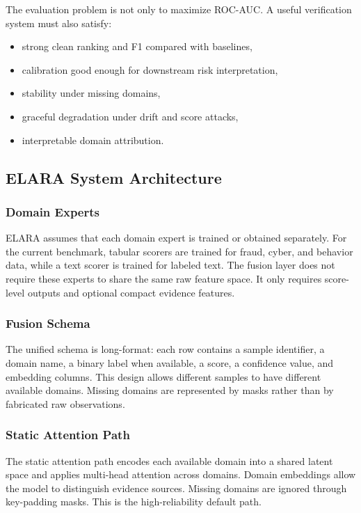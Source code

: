 \documentclass[10pt,conference]{IEEEtran}
\newcommand{\system}{ELARA}
\begin{document}
The evaluation problem is not only to maximize ROC-AUC. A useful verification
system must also satisfy:
\begin{itemize}
  \item strong clean ranking and F1 compared with baselines,
  \item calibration good enough for downstream risk interpretation,
  \item stability under missing domains,
  \item graceful degradation under drift and score attacks,
  \item interpretable domain attribution.
\end{itemize}

\subsection{\system{} System Architecture}
\subsubsection{Domain Experts}
\system{} assumes that each domain expert is trained or obtained separately.
For the current benchmark, tabular scorers are trained for fraud, cyber, and
behavior data, while a text scorer is trained for labeled text. The fusion layer
does not require these experts to share the same raw feature space. It only
requires score-level outputs and optional compact evidence features.

\subsubsection{Fusion Schema}
The unified schema is long-format: each row contains a sample identifier, a
domain name, a binary label when available, a score, a confidence value, and
embedding columns. This design allows different samples to have different
available domains. Missing domains are represented by masks rather than by
fabricated raw observations.

\subsubsection{Static Attention Path}
The static attention path encodes each available domain into a shared latent
space and applies multi-head attention across domains. Domain embeddings allow
the model to distinguish evidence sources. Missing domains are ignored through
key-padding masks. This is the high-reliability default path.
\end{document}
